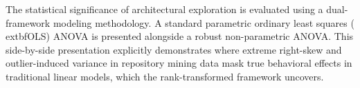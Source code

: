 The statistical significance of architectural exploration is evaluated using a dual-framework modeling methodology. A standard parametric ordinary least squares (	extbf{OLS}) ANOVA is presented alongside a robust non-parametric ANOVA. This side-by-side presentation explicitly demonstrates where extreme right-skew and outlier-induced variance in repository mining data mask true behavioral effects in traditional linear models, which the rank-transformed framework uncovers.